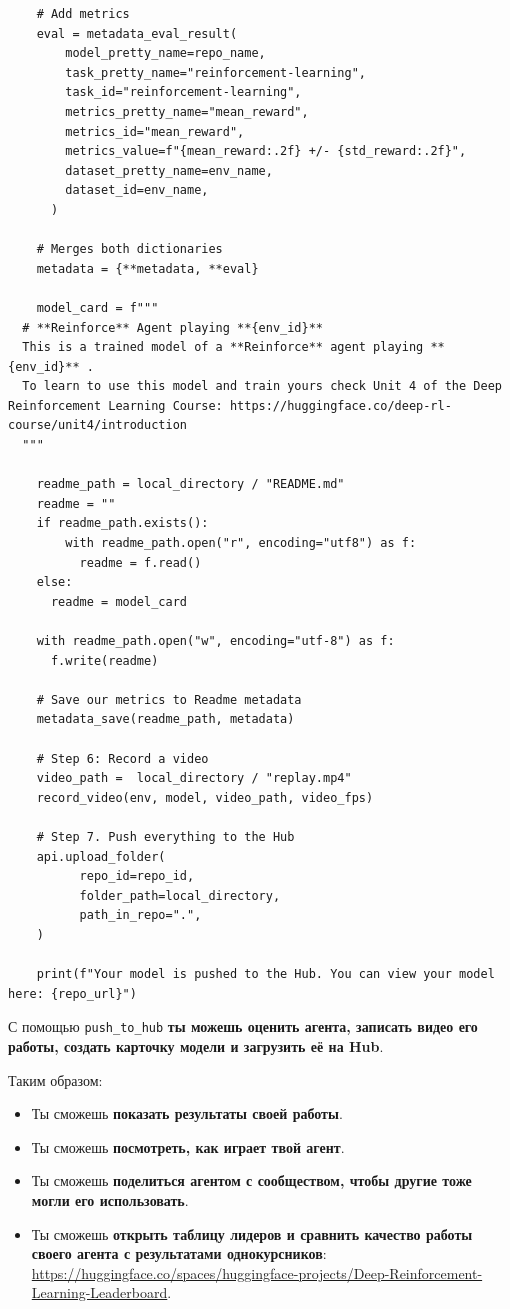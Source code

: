 \documentclass[11pt,a4paper]{article}
\begin{document}
\begin{lstlisting}
    # Add metrics
    eval = metadata_eval_result(
        model_pretty_name=repo_name,
        task_pretty_name="reinforcement-learning",
        task_id="reinforcement-learning",
        metrics_pretty_name="mean_reward",
        metrics_id="mean_reward",
        metrics_value=f"{mean_reward:.2f} +/- {std_reward:.2f}",
        dataset_pretty_name=env_name,
        dataset_id=env_name,
      )

    # Merges both dictionaries
    metadata = {**metadata, **eval}

    model_card = f"""
  # **Reinforce** Agent playing **{env_id}**
  This is a trained model of a **Reinforce** agent playing **{env_id}** .
  To learn to use this model and train yours check Unit 4 of the Deep Reinforcement Learning Course: https://huggingface.co/deep-rl-course/unit4/introduction
  """

    readme_path = local_directory / "README.md"
    readme = ""
    if readme_path.exists():
        with readme_path.open("r", encoding="utf8") as f:
          readme = f.read()
    else:
      readme = model_card

    with readme_path.open("w", encoding="utf-8") as f:
      f.write(readme)

    # Save our metrics to Readme metadata
    metadata_save(readme_path, metadata)

    # Step 6: Record a video
    video_path =  local_directory / "replay.mp4"
    record_video(env, model, video_path, video_fps)

    # Step 7. Push everything to the Hub
    api.upload_folder(
          repo_id=repo_id,
          folder_path=local_directory,
          path_in_repo=".",
    )

    print(f"Your model is pushed to the Hub. You can view your model here: {repo_url}")
\end{lstlisting}

С помощью \texttt{push\_to\_hub} \textbf{ты можешь оценить агента, записать видео его работы, создать карточку модели и загрузить её на Hub}.

Таким образом:

\begin{itemize}
\tightlist
\item
  Ты сможешь \textbf{показать результаты своей работы}.
\item
  Ты сможешь \textbf{посмотреть, как играет твой агент}.
\item
  Ты сможешь \textbf{поделиться агентом с сообществом, чтобы другие тоже могли его использовать}.
\item
  Ты сможешь \textbf{открыть таблицу лидеров и сравнить качество работы своего агента с результатами однокурсников}: \url{https://huggingface.co/spaces/huggingface-projects/Deep-Reinforcement-Learning-Leaderboard}.
\end{itemize}
\end{document}
